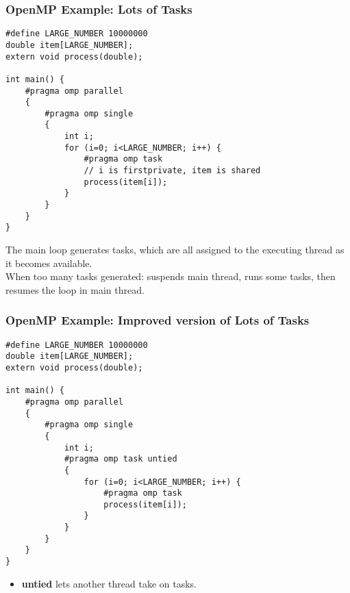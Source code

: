 \begin{frame}[fragile]
  \frametitle{OpenMP Example: Lots of Tasks}

  
  \begin{lstlisting}
#define LARGE_NUMBER 10000000
double item[LARGE_NUMBER];
extern void process(double);

int main() {
    #pragma omp parallel
    {
        #pragma omp single
        {
            int i;
            for (i=0; i<LARGE_NUMBER; i++) {
                #pragma omp task
                // i is firstprivate, item is shared
                process(item[i]);
            }
        }
    }
}
  \end{lstlisting}


  The main loop generates tasks, which are all assigned to the executing thread as it becomes available.\\[1em]
  When too many tasks generated: suspends main thread, runs some tasks, then resumes the loop in main thread.
  
\end{frame}

\begin{frame}[fragile]
  \frametitle{OpenMP Example: Improved version of Lots of Tasks}

  
  \begin{lstlisting}
#define LARGE_NUMBER 10000000
double item[LARGE_NUMBER];
extern void process(double);

int main() {
    #pragma omp parallel
    {
        #pragma omp single
        {
            int i;
            #pragma omp task untied
            {
                for (i=0; i<LARGE_NUMBER; i++) {
                    #pragma omp task
                    process(item[i]);
                }
            }
        }
    }
}
  \end{lstlisting}
  
  \begin{itemize}
    \item {\bf untied} lets another thread take on tasks.
  \end{itemize}
  
\end{frame}

